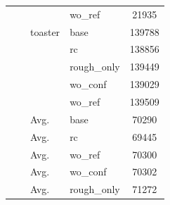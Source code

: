 \begin{table}[t]
{\begin{tabular}{llllc}
 &  &  & wo\_ref & 21935 \\
 &  & toaster & base & 139788 \\
 &  &  & rc & 138856 \\
 &  &  & rough\_only & 139449 \\
 &  &  & wo\_conf & 139029 \\
 &  &  & wo\_ref & 139509 \\
 & & Avg. & base & 70290 \\
 & & Avg. & rc & 69445 \\
 & & Avg. & wo\_ref & 70300 \\
 & & Avg. & wo\_conf & 70302 \\
 & & Avg. & rough\_only & 71272 \\
\bottomrule
\end{tabular}}
\end{table}
